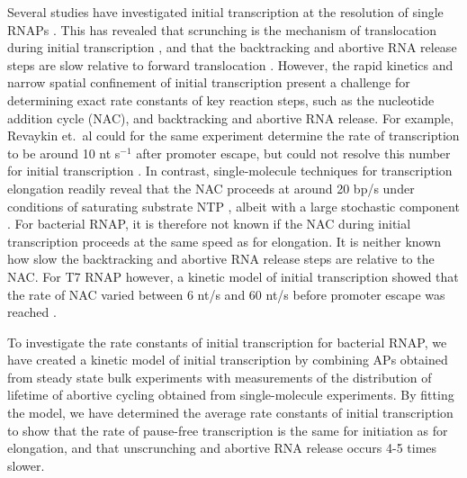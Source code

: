 Several studies have investigated initial transcription at the resolution of single
RNAPs \cite{kapanidis_retention_2005, margeat_direct_2006,
revyakin_abortive_2006, tang_real-time_2009, kapanidis_initial_2006}. This has
revealed that scrunching is the mechanism of translocation during initial
transcription \cite{revyakin_abortive_2006, kapanidis_initial_2006}, and that
the backtracking and abortive RNA release steps are slow relative to forward
translocation \cite{margeat_direct_2006, revyakin_abortive_2006}. However, the
rapid kinetics and narrow spatial confinement of initial transcription
present a challenge for determining exact rate constants of key reaction
steps, such as the nucleotide addition cycle (NAC), and backtracking and
abortive RNA release. For example, Revaykin et.\ al could for the same
experiment determine the rate of transcription to be around 10 nt s$^{-1}$
after promoter escape, but could not resolve this number for initial
transcription \cite{revyakin_abortive_2006}. In contrast, single-molecule
techniques for transcription elongation readily reveal that the NAC proceeds
at around 20 bp/s under conditions of saturating substrate NTP
\cite{bai_mechanochemical_2007, mejia_trigger_2014}, albeit with a large
stochastic component \cite{tolic-norrelykke_diversity_2004}. For bacterial
RNAP, it is therefore not known if the NAC during initial transcription
proceeds at the same speed as for elongation. It is neither known how slow the
backtracking and abortive RNA release steps are relative to the NAC. For T7
RNAP however, a kinetic model of initial transcription showed that the rate of
NAC varied between 6 nt/s and 60 nt/s before promoter escape was reached
\cite{tang_real-time_2009}. 

To investigate the rate constants of initial transcription for bacterial RNAP,
we have created a kinetic model of initial transcription by combining APs
obtained from steady state bulk experiments with measurements of the
distribution of lifetime of abortive cycling obtained from single-molecule
experiments. By fitting the model, we have determined the average rate
constants of initial transcription to show that the rate of pause-free
transcription is the same for initiation as for elongation, and that
unscrunching and abortive RNA release occurs 4-5 times slower.
